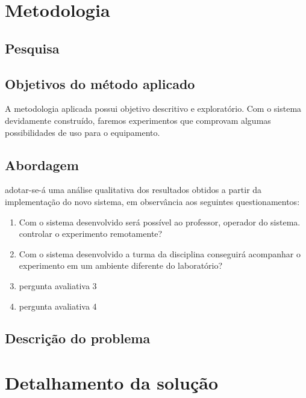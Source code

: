 \documentclass[12pt,a4paper,oneside]{book}
\begin{document}

\chapter{Metodologia}
\label{chapter:Metodologia}
%
\thispagestyle{empty} 
%
\section{Pesquisa}


%
\section{Objetivos do método aplicado}
A metodologia aplicada possui objetivo descritivo e exploratório. Com o sistema devidamente construído, faremos experimentos que comprovam algumas possibilidades de uso para o equipamento.

\section{Abordagem}
adotar-se-á uma análise qualitativa dos resultados obtidos a partir da implementação do novo sistema, em observância aos seguintes questionamentos:
\begin{enumerate}
    \item Com o sistema desenvolvido será possível ao professor, operador do sistema. controlar o experimento remotamente?
    \item Com o sistema desenvolvido a turma da disciplina conseguirá acompanhar o experimento em um ambiente diferente do laboratório?
    \item pergunta avaliativa 3
    \item pergunta avaliativa 4
\end{enumerate}
%
%

\section{Descrição do problema}


%
\chapter{Detalhamento da solução}
%
\thispagestyle{empty} 
%
\end{document}
